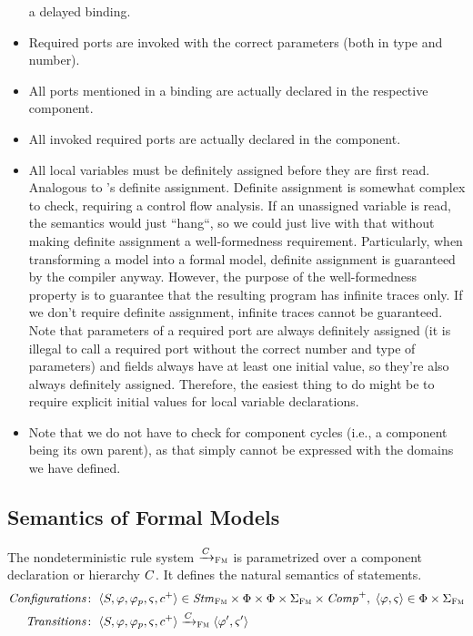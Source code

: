 \documentclass[a4paper,10pt,english]{article}
\begin{document}
\begin{itemize}
	a delayed binding.
	\item Required ports are invoked with the correct parameters (both in type and number).
	\item All ports mentioned in a binding are actually declared in the respective component.
	\item All invoked required ports are actually declared in the component.
	\item All local variables must be definitely assigned before they are first read. Analogous to \CSharp's definite assignment.
	Definite assignment is somewhat complex to check, requiring a control flow analysis. If an unassigned variable is read, the
	semantics would just ``hang``, so we could just live with that without making definite assignment a well-formedness requirement.
	Particularly, when transforming a \SSharp model into a formal model, definite assignment is guaranteed by the \CSharp compiler
	anyway. However, the purpose of the well-formedness property is to guarantee that the resulting \Fil program
	has infinite traces only. If we don't require definite assignment, infinite traces cannot be guaranteed. Note that parameters
	of a required port are always definitely assigned (it is illegal to call a required port without the correct number and type of
	parameters) and fields always have at least one initial value, so they're also always definitely assigned. Therefore, the easiest thing to do might be to require explicit initial values for
	local variable declarations.
	\item Note that we do not have to check for component cycles (i.e., a component being its own parent), as that simply cannot be
	expressed with the domains we have defined.
\end{itemize}

\subsection{Semantics of Formal Models}
The nondeterministic rule system $\xrightarrow{C}_\textsc{Fm}$ is parametrized over a component declaration or hierarchy $C$. It defines
the natural semantics of statements.
\begin{align*}
	\mathit{Configurations} \colon & \;\langle S, \varphi, \varphi_p, \varsigma, c^+ \rangle \in \mathit{Stm}_\textsc{Fm}
	\times \Phi \times \Phi \times \Sigma_\textsc{Fm} \times \mathit{Comp}^+, \; \langle \varphi, \varsigma \rangle \in
	\Phi
	\times
	\Sigma_\textsc{Fm}
	\\
	\mathit{Transitions} \colon & \;\langle S, \varphi, \varphi_p, \varsigma, c^+ \rangle \xrightarrow{C}_\textsc{Fm}
	\langle \varphi', \varsigma' \rangle
\end{align*}
\end{document}
